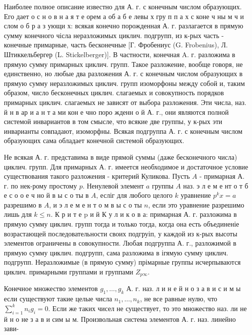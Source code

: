 \documentclass[10pt]{article}
\begin{document}
Наиболее полное описание известно для А. г. с конечным числом образующих. Его дает о с н о в н а я т е орем а об а б е левы х гру п п а х с коне ч ны м ч и слом о б р а з ующи х: всякая конечно порожденная А. г. разлагается в прямую сумму конечного чісла неразложимых циклич. подгрупп, из к-рых часть - конечные примарные, часть бесконечные [Г. Фробениус (G. Frobenius), Л. Штиккельбергер (L. Stickelberger)]. В частности, конечная A. г. разложима в прямую сумму примарных циклич. групп. Такое разложение, вообще говоря, не единственно, но любые два разложения А. г. с конечным числом образующих в прямую сумму неразложимых циклич. групп изоморфоны между собой и, таким образом, число бесконечных циклич. слагаемых и совокупность порядков примарных циклич. слагаемых не зависят от выбора разложения. Эти числа, наз. й н в ар и а н т а ми кон е чно поро жденн о й А. г., они являются полной системой инвариантов в том смысле, что всякие две группы, у к-рых эти инварианты совпадают, изоморфны. Всякая подгруппа А. г. с конечным числом образующих сама обладает конечной системой образующих.



Не всякая А. г. представима в виде прямой суммы (даже бесконечного числа) циклич. групп. Для примарных А. г. имеется необходимое и достаточное условие существования такого разложения - критерий Куликова. Пусть $A$ - примарная А. г. по нек-рому простому $p$. Ненулевой элемент $a$ группы $A$ наз. э л е м е нт о т б е с о о е ч но й в ы с о ты в $A$, есліг для любого целого $k$ уравнение $p^{k} x=a$ разрешимо в $A$, и э л е м е н т о м в ы с о ты $n$, если это уравнение разрешимо лишь для $k \leqslant n$. К р и т е $\mathrm{p}$ и й К у л и к о в а: примарная А. г. разложима в прямую сумму циклич. групп тогда и только тогда, когда она есть объединеніе возрастающей последовательности своих подгруіп, у каждой из к-рых высоты элементов ограничены в совокупности. Любая подгруппа А. г., разложимой в прямую сумму циклич. подгрупп, сама разложима в ігямую сумму циклич. подгрупп. Неразложимые (в прямую сумму) прімарные группы исчерпываются циклич. примарными группами и группами $Z_{p \infty}$.



Конечное множество элементов $g_{1}, \ldots, g_{k}$ А. г. наз. л и н е й н о з а в и с и м ы если существуют такие целые числа $n_{1}, \ldots, n_{k}$, не все равные нулю, что $\sum_{i=1}^{k} n_{i} g_{i}=0$. Если же таких чисел не существует, то это множество наз. ли не й н о не з а в и сим ы м. Произвольная система элементов А. г. наз. линейно зави-
\end{document}
